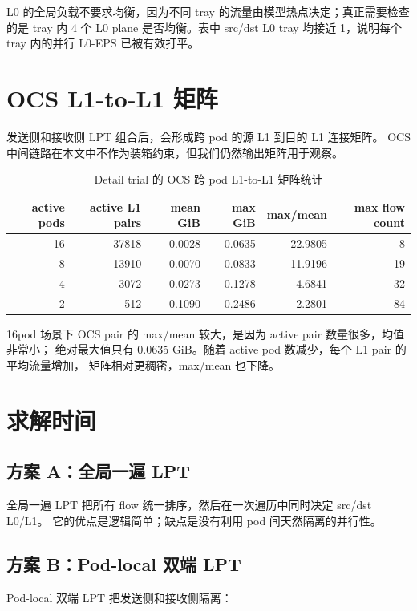 \documentclass[UTF8,a4paper,11pt,fontset=none]{ctexart}
\begin{document}
L0 的全局负载不要求均衡，因为不同 tray 的流量由模型热点决定；真正需要检查的是 tray 内 4 个 L0 plane
是否均衡。表中 src/dst L0 tray 均接近 1，说明每个 tray 内的并行 L0-EPS 已被有效打平。

\section{OCS L1-to-L1 矩阵}

发送侧和接收侧 LPT 组合后，会形成跨 pod 的源 L1 到目的 L1 连接矩阵。
OCS 中间链路在本文中不作为装箱约束，但我们仍然输出矩阵用于观察。

\begin{table}[H]
\centering
\caption{Detail trial 的 OCS 跨 pod L1-to-L1 矩阵统计}
\begin{tabular}{rrrrrr}
\toprule
active pods & active L1 pairs & mean GiB & max GiB & max/mean & max flow count \\
\midrule
16 & 37818 & 0.0028 & 0.0635 & 22.9805 & 8  \\
8  & 13910 & 0.0070 & 0.0833 & 11.9196 & 19 \\
4  & 3072  & 0.0273 & 0.1278 & 4.6841  & 32 \\
2  & 512   & 0.1090 & 0.2486 & 2.2801  & 84 \\
\bottomrule
\end{tabular}
\label{tab:ocs}
\end{table}

16pod 场景下 OCS pair 的 max/mean 较大，是因为 active pair 数量很多，均值非常小；
绝对最大值只有 0.0635 GiB。随着 active pod 数减少，每个 L1 pair 的平均流量增加，
矩阵相对更稠密，max/mean 也下降。

\section{求解时间}

\subsection{方案 A：全局一遍 LPT}

全局一遍 LPT 把所有 flow 统一排序，然后在一次遍历中同时决定 src/dst L0/L1。
它的优点是逻辑简单；缺点是没有利用 pod 间天然隔离的并行性。

\subsection{方案 B：Pod-local 双端 LPT}

Pod-local 双端 LPT 把发送侧和接收侧隔离：
\end{document}
